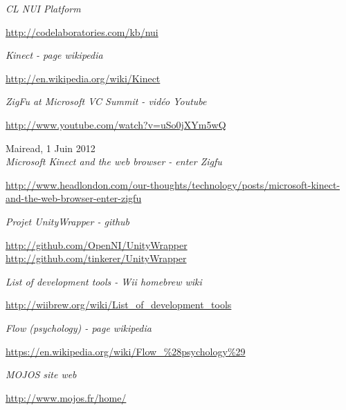 \begin{thebibliography}{9}
  \emph{CL NUI Platform}\\
  \begin{small}
  \url{http://codelaboratories.com/kb/nui}
  \end{small}
  
  \emph{Kinect - page wikipedia}\\
  \begin{small}
  \url{http://en.wikipedia.org/wiki/Kinect}
  \end{small}
  
  \emph{ZigFu at Microsoft VC Summit - vidéo Youtube}\\
  \begin{small}
  \url{http://www.youtube.com/watch?v=uSo0jXYm5wQ}
  \end{small}
  
  Mairead, 1 Juin 2012\\
  \emph{Microsoft Kinect and the web browser - enter Zigfu}\\
  \begin{small}
  \url{http://www.headlondon.com/our-thoughts/technology/posts/microsoft-kinect-and-the-web-browser-enter-zigfu}
  \end{small}
  
  \emph{Projet UnityWrapper - github}\\
  \begin{small}
  \url{http://github.com/OpenNI/UnityWrapper}\\
  \url{http://github.com/tinkerer/UnityWrapper}
  \end{small}
  
  \emph{List of development tools - Wii homebrew wiki}\\
  \begin{small}
  \url{http://wiibrew.org/wiki/List_of_development_tools}
  \end{small}
  
  \emph{Flow (psychology) - page wikipedia}\\
  \begin{small}
  \url{https://en.wikipedia.org/wiki/Flow_\%28psychology\%29}
  \end{small}
  
  \emph{MOJOS site web}\\
  \begin{small}
  \url{http://www.mojos.fr/home/}
  \end{small}
  
\end{thebibliography}
        
